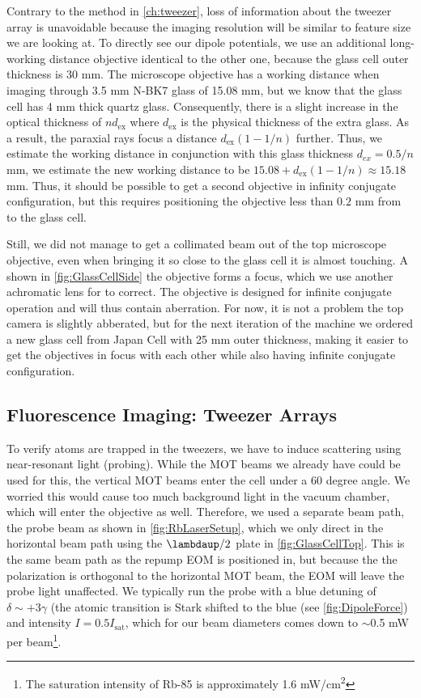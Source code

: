 Contrary to the method in \cref{ch:tweezer}, loss of information about the tweezer array is unavoidable because the imaging resolution will be similar to feature size we are looking at.
To directly see our dipole potentials, we use an additional long-working distance objective identical to the other one, because the glass cell outer thickness is 30 mm. 
The microscope objective has a working distance when imaging through 3.5 mm N-BK7 glass of 15.08 mm, but we know that the glass cell has 4 mm thick quartz glass.
Consequently, there is a slight increase in the optical thickness of $n d_{\text{ex}}$ where $d_{\text{ex}}$ is the physical thickness of the extra glass.
As a result, the paraxial rays focus a distance $d_{\text{ex}}(1-1/n)$ further.
Thus, we estimate the working distance in conjunction with this glass thickness $d_{ex} = 0.5/n$ mm, we estimate the new working distance to be $15.08 + d_{\text{ex}}(1-1/n) \approx 15.18$ mm.
Thus, it should be possible to get a second objective in infinity conjugate configuration, but this requires positioning the objective less than $0.2$ mm from to the glass cell.

Still, we did not manage to get a collimated beam out of the top microscope objective, even when bringing it so close to the glass cell it is almost touching. A shown in \cref{fig:GlassCellSide} the objective forms a focus, which we use another achromatic lens for to correct. 
The objective is designed for infinite conjugate operation and will thus contain aberration. 
For now, it is not a problem the top camera is slightly abberated, but for the next iteration of the machine we ordered a new glass cell from Japan Cell with 25 mm outer thickness, making it easier to get the objectives in focus with each other while also having infinite conjugate configuration.

\subsection{Fluorescence Imaging: Tweezer Arrays}


To verify atoms are trapped in the tweezers, we have to induce scattering using near-resonant light (probing). 
While the MOT beams we already have could be used for this, the vertical MOT beams enter the cell under a 60 degree angle.
We worried this would cause too much background light in the vacuum chamber, which will enter the objective as well. 
Therefore, we used a separate beam path, the probe beam as shown in \cref{fig:RbLaserSetup}, which we only direct in the horizontal beam path using the $\lambdaup/2$ plate in \cref{fig:GlassCellTop}.
This is the same beam path as the repump EOM is positioned in, but because the the polarization is orthogonal to the horizontal MOT beam, the EOM will leave the probe light unaffected. 
We typically run the probe with a blue detuning of $\delta \sim +3\gamma$ (the atomic transition is Stark shifted to the blue (see \cref{fig:DipoleForce}) and intensity $I = 0.5 I_{\text{sat}}$, which for our beam diameters comes down to $\sim0.$5 mW per beam\footnote{The saturation intensity of Rb-85 is approximately 1.6 mW/cm\textsuperscript{2}}. 

